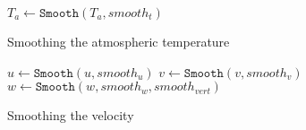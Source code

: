 \begin{algorithm}
    $T_a \leftarrow \texttt{Smooth}(T_a, smooth_t)$ \;
    \caption{Smoothing the atmospheric temperature}
    \label{alg:smootht}
\end{algorithm}

\begin{algorithm}
    $u \leftarrow \texttt{Smooth}(u, smooth_u)$ \;
    $v \leftarrow \texttt{Smooth}(v, smooth_v)$ \;
    $w \leftarrow \texttt{Smooth}(w, smooth_w, smooth_{vert})$ \;
    \caption{Smoothing the velocity}
    \label{alg:smoothv}
\end{algorithm}